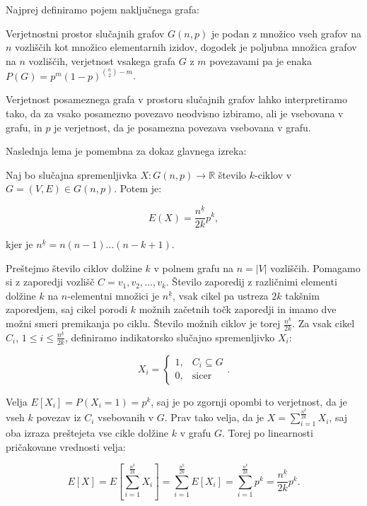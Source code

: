 \documentclass[mat1, tisk]{fmfdelo}
\begin{document}
Najprej definiramo pojem naključnega grafa:

    \begin{definicija}
        Verjetnostni prostor slučajnih grafov $G(n, p)$ je podan z množico vseh grafov na $n$ vozliščih kot množico elementarnih izidov, dogodek je poljubna množica grafov na $n$ vozliščih, verjetnost vsakega grafa $G$
        z $m$ povezavami pa je enaka $P(G) = p^m(1 - p)^{\binom{n}{2}-m}$.
    \end{definicija}

    \begin{opomba}
        Verjetnost posameznega grafa v prostoru slučajnih grafov lahko interpretiramo tako, da za vsako posamezno povezavo neodvisno izbiramo, ali je vsebovana v grafu, in $p$ je verjetnost, da je posamezna povezava vsebovana v grafu.
    \end{opomba}

Naslednja lema je pomembna za dokaz glavnega izreka:

    \begin{lema}
        Naj bo slučajna spremenljivka $X : G(n, p) \to \mathbb{R}$ število $k$-ciklov v $G = (V, E) \in G(n, p)$. Potem je:

        $$E(X) = \frac{n^{\underline{k}}}{2k}p^k,$$

        kjer je $n^{\underline{k}} = n(n-1)\ldots(n-k+1)$.
    \end{lema}

    \begin{dokaz}
        Preštejmo število ciklov dolžine $k$ v polnem grafu na $n = |V|$ vozliščih. Pomagamo si z zaporedji vozlišč $C = v_1,v_2,\ldots,v_k$. Število zaporedij z različnimi elementi dolžine $k$ na $n$-elementni množici je $n^{\underline{k}}$, vsak cikel
        pa ustreza $2k$ takšnim zaporedjem, saj cikel porodi $k$ možnih začetnih točk zaporedji in imamo dve možni smeri premikanja po ciklu. Število možnih ciklov je torej $\frac{n^{\underline{k}}}{2k}$. Za vsak cikel $C_i$, $1 \leq i \leq \frac{n^{\underline{k}}}{2k}$,
        definiramo indikatorsko slučajno spremenljivko $X_i$:

        $$X_i = \begin{cases}
            1, & C_i \subseteq G \\
            0, & \text{sicer}
        \end{cases}.$$

        Velja $E[X_i] = P(X_i = 1) = p^k$, saj je po zgornji opombi to verjetnost, da je vseh $k$ povezav iz $C_i$ vsebovanih v $G$. Prav tako velja, da je $X = \sum_{i=1}^{\frac{n^{\underline{k}}}{2k}}X_i$, saj oba izraza preštejeta vse cikle dolžine $k$
        v grafu $G$. Torej po linearnosti pričakovane vrednosti velja:

        $$E[X] = E[\sum_{i=1}^{\frac{n^{\underline{k}}}{2k}}X_i] = \sum_{i=1}^{\frac{n^{\underline{k}}}{2k}}E[X_i] = \sum_{i=1}^{\frac{n^{\underline{k}}}{2k}}p^k = \frac{n^{\underline{k}}}{2k}p^k.$$
    \end{dokaz}
\end{document}
